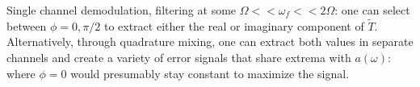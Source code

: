 Single channel demodulation, filtering at some $\Omega << \omega_f << 2\Omega$:
one can select between $\phi = 0, \pi/2$ to extract either the real or imaginary component of $\tilde{T}$. Alternatively, through quadrature mixing, one can extract both values in separate channels and create a variety of error signals that share extrema with $a(\omega)$:
where $\phi=0$ would presumably stay constant to maximize the signal.